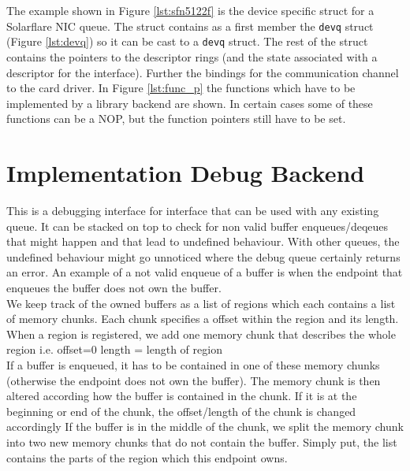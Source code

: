\documentclass[a4paper,11pt,twoside]{report}
\begin{document}
The example shown in Figure \ref{lst:sfn5122f} is the device specific struct for a Solarflare NIC queue.
The struct contains as a first member the \texttt{devq} struct (Figure \ref{lst:devq}) so it can be 
cast to a \texttt{devq} struct. The rest of the struct contains the pointers to the descriptor rings (and
the state associated with a descriptor for the \devif interface). Further the bindings for the 
communication channel to the card driver. In Figure \ref{lst:func_p} the functions which have 
to be implemented by a library backend are shown. In certain cases some of these functions
can be a NOP, but the function pointers still have to be set.

\section{Implementation Debug Backend}
This is a debugging interface for \devif interface that            
can be used with any existing queue. It can be stacked on top                
to check for non valid buffer enqueues/deqeues that might happen and
that lead to undefined behaviour. With other queues, the undefined behaviour
might go unnoticed where the debug queue certainly returns an error.      
An example of a not valid enqueue of a buffer is when the endpoint that enqueues           
the buffer does not own the buffer.                                          
\\                                                                     
We keep track of the owned buffers as a list of regions which each           
contains a list of memory chunks. Each chunk specifies a offset within 
the region and its length. When a region is registered, we add one memory chunk that describes          
the whole region i.e. offset=0 length = length of region                      
\\                                                                           
If a buffer is enqueued, it has to be contained in one of these            
memory chunks (otherwise the endpoint does not own the buffer). 
The memory chunk is then altered according how the buffer is contained in the chunk. 
If it is at the beginning or end of the chunk, the offset/length of the chunk is changed accordingly      
If the buffer is in the middle of the chunk, we split the memory chunk       
into two new memory chunks that do not contain the buffer. Simply put, the list contains the 
parts of the region which this endpoint owns.                   
\\                                                                           
\end{document}
